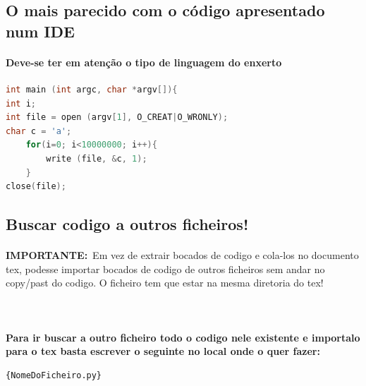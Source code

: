 \documentclass[a4paper,11pt]{report}%
\begin{document}
\subsection {O mais parecido com o código apresentado num IDE}

\paragraph {Deve-se ter em atenção o tipo de linguagem do enxerto}
\begin{lstlisting}[language=c]
int main (int argc, char *argv[]){
int i; 
int file = open (argv[1], O_CREAT|O_WRONLY);
char c = 'a'; 
	for(i=0; i<10000000; i++){
		write (file, &c, 1); 
	}
close(file);
\end{lstlisting}



\newpage
\subsection{Buscar codigo a outros ficheiros!}

\paragraph{} \textbf{IMPORTANTE:}\ Em vez de extrair bocados de codigo e cola-los no documento tex, podesse importar bocados de codigo de outros ficheiros sem andar no copy/past do codigo. O ficheiro tem que estar na mesma diretoria do tex!
\paragraph{}

\paragraph{\ \ }\textbf{Para ir buscar a outro ficheiro todo o codigo nele existente e importalo para o tex basta escrever o seguinte no local onde o quer fazer:}
\begin{verbatim}
{NomeDoFicheiro.py}
\end{verbatim}
\end{document}
